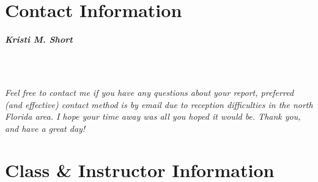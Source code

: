 \documentclass[10pt]{article}
\begin{document}
\section*{Contact Information}

\begin{framed}
\begin{center}
\large{\textit{\textbf{Kristi M. Short}}}
\end{center}

 \\
 \\
\begin{center}
\end{center}

\textit{Feel free to contact me if you have any questions about your report, preferred (and effective) contact method is by email due to reception difficulties in the north Florida area. I hope your time away was all you hoped it would be. Thank you, and have a great day!}
\end{framed}



\section*{Class \& Instructor Information}


\begin{framed}
 \\
 \\
 \\
 \\
\end{framed}

\vspace{0.15in}
\end{document}
